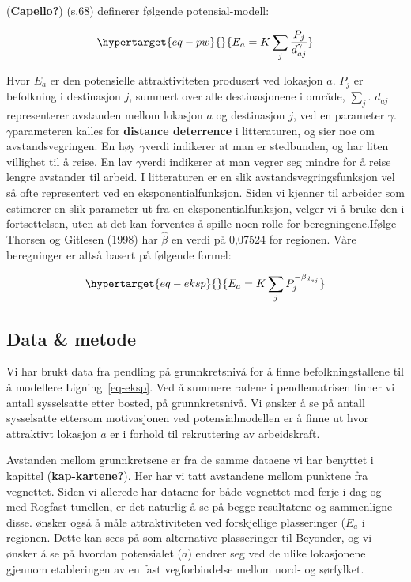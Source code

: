 \documentclass[
]{article}
\begin{document}
(\textbf{Capello?}) (s.68) definerer følgende potensial-modell:

\begin{equation}\protect\hypertarget{eq-pw}{}{
E_a = K \sum_j \frac{P_j}{d^\gamma_{aj}}
}\label{eq-pw}\end{equation}

Hvor \(E_a\) er den potensielle attraktiviteten produsert ved lokasjon
\(a\). \(P_j\) er befolkning i destinasjon \(j\), summert over alle
destinasjonene i område, \(\sum_j\). \(d_{aj}\) representerer avstanden
mellom lokasjon \(a\) og destinasjon \(j\), ved en parameter \(\gamma\).
\(\gamma\)parameteren kalles for \textbf{distance deterrence} i
litteraturen, og sier noe om avstandsvegringen. En høy \(\gamma\)verdi
indikerer at man er stedbunden, og har liten villighet til å reise. En
lav \(\gamma\)verdi indikerer at man vegrer seg mindre for å reise
lengre avstander til arbeid. I litteraturen er en slik
avstandsvegringsfunksjon vel så ofte representert ved en
eksponentialfunksjon. Siden vi kjenner til arbeider som estimerer en
slik parameter ut fra en eksponentialfunksjon, velger vi å bruke den i
fortsettelsen, uten at det kan forventes å spille noen rolle for
beregningene.Ifølge Thorsen og Gitlesen (1998) har \(\hat{\beta}\) en
verdi på 0,07524 for regionen. Våre beregninger er altså basert på
følgende formel:

\begin{equation}\protect\hypertarget{eq-eksp}{}{
E_a = K \sum_j P_j^{- \beta_{d_{aj}}}
}\label{eq-eksp}\end{equation}

\hypertarget{data-metode}{%
\subsection{Data \& metode}\label{data-metode}}

Vi har brukt data fra pendling på grunnkretsnivå for å finne
befolkningstallene til å modellere Ligning~\ref{eq-eksp}. Ved å summere
radene i pendlematrisen finner vi antall sysselsatte etter bosted, på
grunnkretsnivå. Vi ønsker å se på antall sysselsatte ettersom
motivasjonen ved potensialmodellen er å finne ut hvor attraktivt
lokasjon \(a\) er i forhold til rekruttering av arbeidskraft.

Avstanden mellom grunnkretsene er fra de samme dataene vi har benyttet i
kapittel (\textbf{kap-kartene?}). Her har vi tatt avstandene mellom
punktene fra vegnettet. Siden vi allerede har dataene for både vegnettet
med ferje i dag og med Rogfast-tunellen, er det naturlig å se på begge
resultatene og sammenligne disse. ønsker også å måle attraktiviteten ved
forskjellige plasseringer (\(E_a\) i regionen. Dette kan sees på som
alternative plasseringer til Beyonder, og vi ønsker å se på hvordan
potensialet (\(a\)) endrer seg ved de ulike lokasjonene gjennom
etableringen av en fast vegforbindelse mellom nord- og sørfylket.
\end{document}
